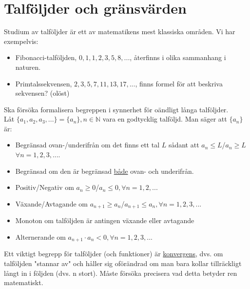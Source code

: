 \chapter{Talföljder och gränsvärden}
Studium av talföljder är ett av matematikens mest klassiska områden.
Vi har exempelvis:
\begin{itemize}
    \item Fibonacci-talföljden, $0,1,1,2,3,5,8,...$, återfinns i olika sammanhang i naturen.
    \item Primtalssekvensen, $2,3,5,7,11,13,17,...$, finns formel för att beskriva sekvensen? (olöst)
\end{itemize}
Ska försöka formalisera begreppen i synnerhet för oändligt långa talföljder.\\
Låt $\{a_1,a_2,a_3,...\}=\{a_n\}, n\in\mathbb{N}$ vara en godtycklig talföljd.
Man säger att $\{a_n\}$ är:
\begin{itemize}
    \item Begränsad ovan-/underifrån om det finns ett tal $L$ sådant att $a_n\leq L$/$a_n\geq L$ $\forall n=1,2,3,...$.
    \item Begränsad om den är begränsad \underline{både} ovan- och underifrån.
    \item Positiv/Negativ om $a_n\geq 0$/$a_n\leq 0, \forall n=1,2,...$
    \item Växande/Avtagande om $a_{n+1}\geq a_n$/$a_{n+1}\leq a_n,\forall n=1,2,3,...$
    \item Monoton om talföljden är antingen växande eller avtagande
    \item Alternerande om $a_{n+1}\cdot a_n <0,\forall n=1,2,3,...$
\end{itemize}
Ett viktigt begrepp för talföljder (och funktioner) är \underline{konvergens}, dvs. om talföljden "stannar av" och håller sig oförändrad om man bara kollar tillräckligt långt in i följden (dvs. n stort).
Måste försöka precisera vad detta betyder ren matematiskt.
